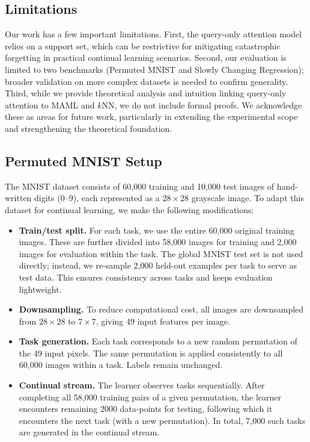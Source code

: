 \documentclass{article}
\begin{document}
\subsection{Limitations}
\label{sec:limitations}
Our work has a few important limitations.  
First, the query-only attention model relies on a support set, which can be restrictive for mitigating catastrophic forgetting in practical continual learning scenarios.  
Second, our evaluation is limited to two benchmarks (Permuted MNIST and Slowly Changing Regression); broader validation on more complex datasets is needed to confirm generality.  
Third, while we provide theoretical analysis and intuition linking query-only attention to MAML and $k$NN, we do not include formal proofs.  
We acknowledge these as areas for future work, particularly in extending the experimental scope and strengthening the theoretical foundation.



\subsection{Permuted MNIST Setup}
\label{sec:permuted_mnist_setup}
The MNIST dataset \citep{lecun1998gradient} consists of 60,000 training and 10,000 test images of hand-written digits ($0$–$9$), each represented as a $28 \times 28$ grayscale image.  
To adapt this dataset for continual learning, we make the following modifications:

\begin{itemize}
    \item \textbf{Train/test split.} For each task, we use the entire 60,000 original training images. These are further divided into 58,000 images for training and 2,000 images for evaluation within the task. The global MNIST test set is not used directly; instead, we re-sample 2,000 held-out examples per task to serve as test data. This ensures consistency across tasks and keeps evaluation lightweight.
    
    \item \textbf{Downsampling.} To reduce computational cost, all images are downsampled from $28 \times 28$ to $7 \times 7$, giving 49 input features per image.
    
    \item \textbf{Task generation.} Each task corresponds to a new random permutation of the 49 input pixels. The same permutation is applied consistently to all 60,000 images within a task. Labels remain unchanged.
    
    \item \textbf{Continual stream.} The learner observes tasks sequentially. After completing all 58,000 training pairs of a given permutation, the learner encounters remaining 2000 data-points for testing, following which it encounters the next task (with a new permutation). In total, 7,000 such tasks are generated in the continual stream.
\end{itemize}
\end{document}
